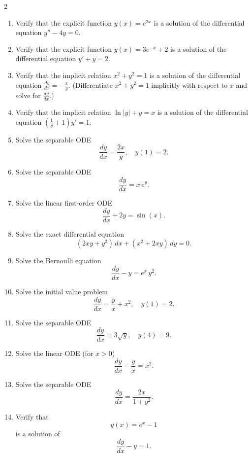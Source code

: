 \begin{multicols}{2}
\begin{enumerate}
    \item Verify that the explicit function $y(x)=e^{2x}$ is a solution of the differential equation $y''-4y=0$.
    
    \item Verify that the explicit function $y(x)=3e^{-x}+2$ is a solution of the differential equation $y'+y=2$.
    
    \item Verify that the implicit relation $x^2+y^2=1$ is a solution of the differential equation $\frac{dy}{dx}=-\frac{x}{y}$. (Differentiate $x^2+y^2=1$ implicitly with respect to $x$ and solve for $\frac{dy}{dx}$.)
    
    \item Verify that the implicit relation $\ln|y|+y=x$ is a solution of the differential equation $\left(\frac{1}{y}+1\right)y'=1$.


    \item Solve the separable ODE
    \[
    \frac{dy}{dx} = \frac{2x}{y}, \quad y(1)=2.
    \]

    \item Solve the separable ODE
    \[
    \frac{dy}{dx} = x\,e^y.
    \]

    \item Solve the linear first-order ODE
    \[
    \frac{dy}{dx} + 2y = \sin(x).
    \]

    \item Solve the exact differential equation
    \[
    (2xy+y^2)\,dx + (x^2+2xy)\,dy = 0.
    \]

    \item Solve the Bernoulli equation
    \[
    \frac{dy}{dx} - y = e^x\,y^2.
    \]

    \item Solve the initial value problem
    \[
    \frac{dy}{dx} = \frac{y}{x} + x^2, \quad y(1)=2.
    \]

    \item Solve the separable ODE
    \[
    \frac{dy}{dx} = 3\sqrt{y}, \quad y(4)=9.
    \]

    \item Solve the linear ODE (for \( x>0 \))
    \[
    \frac{dy}{dx} - \frac{y}{x} = x^2.
    \]

    \item Solve the separable ODE
    \[
    \frac{dy}{dx} = \frac{2x}{1+y^2}.
    \]

    \item Verify that
    \[
    y(x)=e^x-1
    \]
    is a solution of 
    \[
    \frac{dy}{dx} - y = 1.
    \]


\end{enumerate}
\end{multicols}
